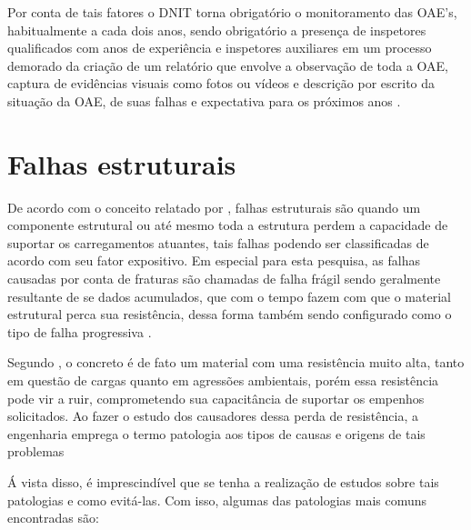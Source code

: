 Por conta de tais fatores o DNIT torna obrigatório o monitoramento das OAE's,  habitualmente a cada dois anos, sendo obrigatório a presença de inspetores qualificados com anos de experiência e inspetores auxiliares em um processo demorado da criação de um relatório que envolve a observação de toda a OAE, captura de evidências visuais como fotos ou vídeos e descrição por escrito da situação da OAE, de suas falhas e expectativa para os próximos anos \cite{dnit2004}.

\section{Falhas estruturais}

De acordo com o conceito relatado por , falhas estruturais são quando um componente estrutural ou até mesmo toda a estrutura perdem a capacidade de suportar os carregamentos atuantes, tais falhas podendo ser classificadas de acordo com seu fator expositivo. 
Em especial para esta pesquisa, as falhas causadas por conta de fraturas são chamadas de falha frágil sendo geralmente resultante de se dados acumulados, que com o tempo fazem com que o material estrutural perca sua resistência, dessa forma também sendo configurado como o tipo de falha progressiva \cite{anneLink2016}.

 Segundo , o concreto é de fato um material com uma resistência muito alta, tanto em questão de cargas quanto em agressões ambientais, porém essa resistência pode vir a ruir, comprometendo sua capacitância de suportar os empenhos solicitados. 
 Ao fazer o estudo dos causadores dessa perda de resistência, a engenharia emprega o termo patologia aos tipos de causas e origens de tais problemas \cite{cremonini1988incidencia}
 
 Á vista disso, é imprescindível  que se tenha a realização de estudos sobre tais patologias e como evitá-las. Com isso, algumas das patologias mais comuns \cite{statera} encontradas são:

